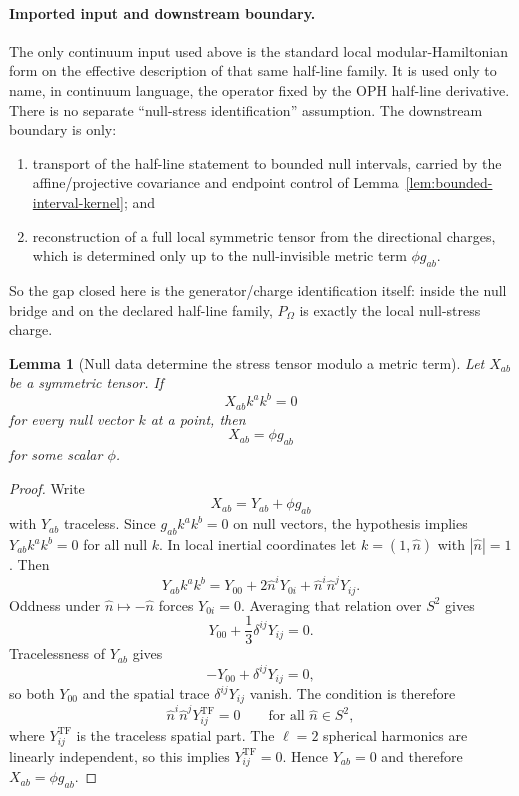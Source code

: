 \documentclass[11pt]{article}
\newtheorem{lemma}[theorem]{Lemma}
\begin{document}
\paragraph{Imported input and downstream boundary.}
The only continuum input used above is the standard local modular-Hamiltonian form on the effective description of that same half-line family. It is used only to name, in continuum language, the operator fixed by the OPH half-line derivative. There is no separate ``null-stress identification'' assumption. The downstream boundary is only:
\begin{enumerate}[label=(\roman*),leftmargin=2.2em]
\item transport of the half-line statement to bounded null intervals, carried by the affine/projective covariance and endpoint control of Lemma~\ref{lem:bounded-interval-kernel}; and
\item reconstruction of a full local symmetric tensor from the directional charges, which is determined only up to the null-invisible metric term \(\phi g_{ab}\).
\end{enumerate}
So the gap closed here is the generator/charge identification itself: inside the null bridge and on the declared half-line family, \(P_\Omega\) is exactly the local null-stress charge.

\begin{lemma}[Null data determine the stress tensor modulo a metric term]\label{lem:nullreconstruct}
Let \(X_{ab}\) be a symmetric tensor. If
\[
X_{ab}k^ak^b=0
\]
for every null vector \(k\) at a point, then
\[
X_{ab}=\phi g_{ab}
\]
for some scalar \(\phi\).
\end{lemma}

\begin{proof}
Write
\[
X_{ab}=Y_{ab}+\phi g_{ab}
\]
with \(Y_{ab}\) traceless. Since \(g_{ab}k^ak^b=0\) on null vectors, the hypothesis implies \(Y_{ab}k^ak^b=0\) for all null \(k\). In local inertial coordinates let \(k=(1,\hat n)\) with \(|\hat n|=1\). Then
\[
Y_{ab}k^ak^b
=
Y_{00}+2\hat n^iY_{0i}+\hat n^i\hat n^jY_{ij}.
\]
Oddness under \(\hat n\mapsto-\hat n\) forces \(Y_{0i}=0\). Averaging that relation over \(S^2\) gives
\[
Y_{00}+\frac13\delta^{ij}Y_{ij}=0.
\]
Tracelessness of \(Y_{ab}\) gives
\[
-Y_{00}+\delta^{ij}Y_{ij}=0,
\]
so both \(Y_{00}\) and the spatial trace \(\delta^{ij}Y_{ij}\) vanish. The condition is therefore
\[
\hat n^i\hat n^j Y_{ij}^{\mathrm{TF}}=0
\qquad
\text{for all }\hat n\in S^2,
\]
where \(Y_{ij}^{\mathrm{TF}}\) is the traceless spatial part. The \(\ell=2\) spherical harmonics are linearly independent, so this implies \(Y_{ij}^{\mathrm{TF}}=0\). Hence \(Y_{ab}=0\) and therefore \(X_{ab}=\phi g_{ab}\).
\end{proof}
\end{document}
